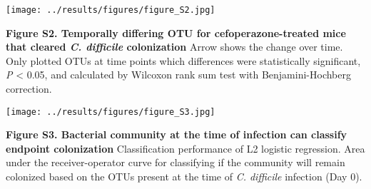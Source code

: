 \documentclass[11pt,]{article}
\begin{document}
\hfill\break

\texttt{[image: ../results/figures/figure\_S2.jpg]}

\textbf{Figure S2. Temporally differing OTU for cefoperazone-treated
mice that cleared \emph{C. difficile} colonization} Arrow shows the
change over time. Only plotted OTUs at time points which differences
were statistically significant, \emph{P} \textless{} 0.05, and
calculated by Wilcoxon rank sum test with Benjamini-Hochberg correction.

\hfill\break

\texttt{[image: ../results/figures/figure\_S3.jpg]}

\textbf{Figure S3. Bacterial community at the time of infection can
classify endpoint colonization} Classification performance of L2
logistic regression. Area under the receiver-operator curve for
classifying if the community will remain colonized based on the OTUs
present at the time of \emph{C. difficile} infection (Day 0).
\end{document}

